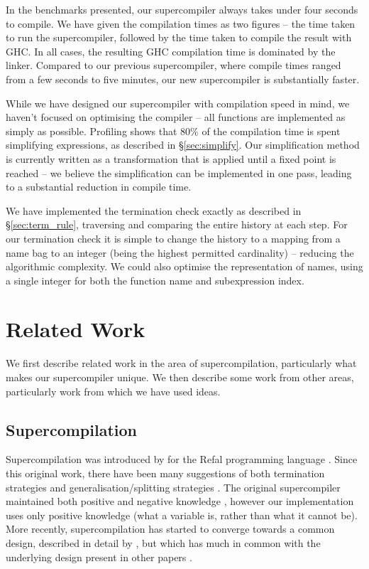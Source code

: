 \documentclass[draft]{sigplanconf}
\begin{document}
In the benchmarks presented, our supercompiler always takes under four seconds to compile. We have given the compilation times as two figures -- the time taken to run the supercompiler, followed by the time taken to compile the result with GHC. In all cases, the resulting GHC compilation time is dominated by the linker. Compared to our previous supercompiler, where compile times ranged from a few seconds to five minutes, our new supercompiler is substantially faster.

While we have designed our supercompiler with compilation speed in mind, we haven't focused on optimising the compiler -- all functions are implemented as simply as possible. Profiling shows that 80\% of the compilation time is spent simplifying expressions, as described in \S\ref{sec:simplify}. Our simplification method is currently written as a transformation that is applied until a fixed point is reached -- we believe the simplification can be implemented in one pass, leading to a substantial reduction in compile time.

We have implemented the termination check exactly as described in \S\ref{sec:term_rule}, traversing and comparing the entire history at each step. For our termination check it is simple to change the history to a mapping from a name bag to an integer (being the highest permitted cardinality) -- reducing the algorithmic complexity. We could also optimise the representation of names, using a single integer for both the function name and subexpression index.

\section{Related Work}

We first describe related work in the area of supercompilation, particularly what makes our supercompiler unique. We then describe some work from other areas, particularly work from which we have used ideas.

\subsection{Supercompilation}
\label{sec:comparison}

Supercompilation was introduced by \citet{supercompilation} for the Refal programming language \cite{refal}. Since this original work, there have been many suggestions of both termination strategies and generalisation/splitting strategies \cite{turchin:generalisation,sorensen:supercompilation,leuschel:homeomorphic}. The original supercompiler maintained both positive and negative knowledge \cite{secher:perfect_supercompilation}, however our implementation uses only positive knowledge (what a variable is, rather than what it cannot be). More recently, supercompilation has started to converge towards a common design, described in detail by \citet{klyuchnikov:hosc}, but which has much in common with the underlying design present in other papers \cite{me:supero,jonsson:supercompilation}.
\end{document}
